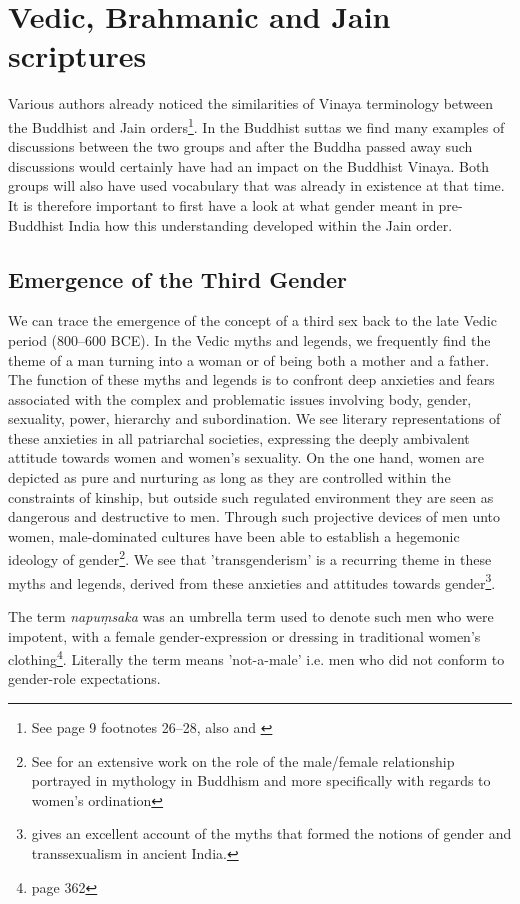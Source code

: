 \section{Vedic, Brahmanic and Jain scriptures}

Various authors already noticed the similarities of Vinaya terminology between the Buddhist and Jain orders\footnote{See \cite{maes2016} page 9 footnotes 26–28, also \cite{sujato2009} and \cite{zwilling}}. In the Buddhist suttas we find many examples of discussions between the two groups and after the Buddha passed away such discussions would certainly have had an impact on the Buddhist Vinaya. Both groups will also have used vocabulary that was already in existence at that time. It is therefore important to first have a look at what gender meant in pre-Buddhist India how this understanding developed within the Jain order.

\subsection{Emergence of the Third Gender}
We can trace the emergence of the concept of a third sex back to the late Vedic period (800–600 BCE). In the Vedic myths and legends, we frequently find the theme of a man turning into a woman or of being both a mother and a father. The function of these myths and legends is to confront deep anxieties and fears associated with the complex and problematic issues involving body, gender, sexuality, power, hierarchy and subordination. We see literary representations of these anxieties in all patriarchal societies, expressing the deeply ambivalent attitude towards women and women's sexuality. On the one hand, women are depicted as pure and nurturing as long as they are controlled within the constraints of kinship, but outside such regulated environment they are seen as dangerous and destructive to men. Through such projective devices of men unto women, male-dominated cultures have been able to establish a hegemonic ideology of gender\footnote{See \cite{sujato2011} for an extensive work on the role of the male/female relationship portrayed in mythology in Buddhism and more specifically with regards to women's ordination}. We see that 'transgenderism' is a recurring theme in these myths and legends, derived from these anxieties and attitudes towards gender\footnote{\cite{goldman} gives an excellent account of the myths that formed the notions of gender and transsexualism in ancient India.}.

The term {\em napuṃsaka} was an umbrella term used to denote such men who were impotent, with a female gender-expression or dressing in traditional women's clothing\footnote{\cite{zwilling} page 362}. Literally the term means 'not-a-male' i.e. men who did not conform to gender-role expectations. 

